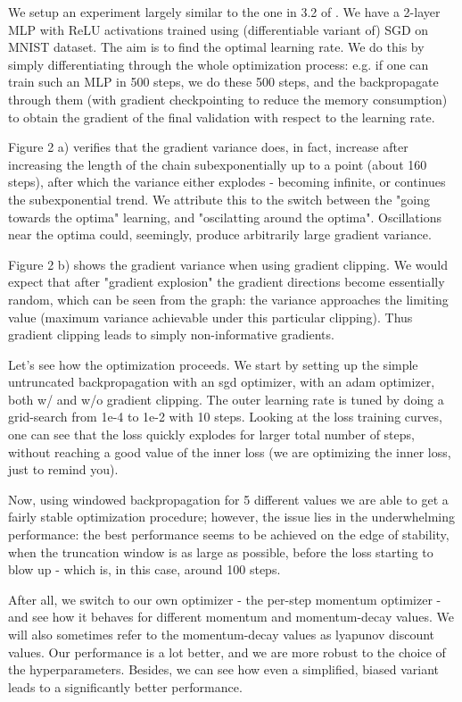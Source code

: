 \documentclass{article}
\begin{document}
We setup an experiment largely similar to the one in 3.2 of \citet{gradients_are_not_all_you_need}. We have a 2-layer MLP with ReLU activations trained using (differentiable variant of) SGD on MNIST dataset. The aim is to find the optimal learning rate. We do this by simply differentiating through the whole optimization process: e.g. if one can train such an MLP in 500 steps, we do these 500 steps, and the backpropagate through them (with gradient checkpointing to reduce the memory consumption) to obtain the gradient of the final validation with respect to the learning rate.

Figure 2 a) verifies that the gradient variance does, in fact, increase after increasing the length of the chain subexponentially up to a point (about 160 steps), after which the variance either explodes - becoming infinite, or continues the subexponential trend. We attribute this to the switch between the "going towards the optima" learning, and "oscilatting around the optima". Oscillations near the optima could, seemingly, produce arbitrarily large gradient variance.

Figure 2 b) shows the gradient variance when using gradient clipping. We would expect that after "gradient explosion" the gradient directions become essentially random, which can be seen from the graph: the variance approaches the limiting value (maximum variance achievable under this particular clipping). Thus gradient clipping leads to simply non-informative gradients.

Let's see how the optimization proceeds. We start by setting up the simple untruncated backpropagation with an sgd optimizer, with an adam optimizer, both w/ and w/o gradient clipping. The outer learning rate is tuned by doing a grid-search from 1e-4 to 1e-2 with 10 steps. Looking at the loss training curves, one can see that the loss quickly explodes for larger total number of steps, without reaching a good value of the inner loss (we are optimizing the inner loss, just to remind you).

Now, using windowed backpropagation for 5 different values we are able to get a fairly stable optimization procedure; however, the issue lies in the underwhelming performance: the best performance seems to be achieved on the edge of stability, when the truncation window is as large as possible, before the loss starting to blow up - which is, in this case, around 100 steps.

After all, we switch to our own optimizer - the per-step momentum optimizer - and see how it behaves for different momentum and momentum-decay values. We will also sometimes refer to the momentum-decay values as lyapunov discount values. Our performance is a lot better, and we are more robust to the choice of the hyperparameters. Besides, we can see how even a simplified, biased variant leads to a significantly better performance.
\end{document}
